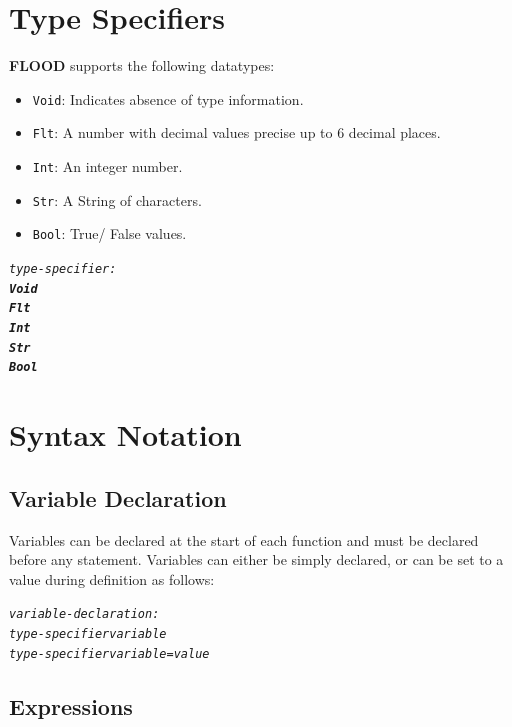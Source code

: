 \documentclass[12pt]{report}
\begin{document}
\section{Type Specifiers}

\textbf{FLOOD} supports the following datatypes:
\begin{itemize}
\item \texttt{Void}: Indicates absence of type information.
\item \texttt{Flt}: A number with decimal values precise up to 6 decimal places.
\item \texttt{Int}: An integer number.
\item \texttt{Str}: A String of characters.
\item \texttt{Bool}: True/ False values.
\end{itemize}
\begin{alltt}\begin{singlespace}
         \textit{type-specifier:}
              \textit{\textbf{Void}}
              \textit{\textbf{Flt}}
              \textit{\textbf{Int}}
              \textit{\textbf{Str}}
              \textit{\textbf{Bool}}\end{singlespace}
\end{alltt}

\section{Syntax Notation}

\subsection{Variable Declaration}

Variables can be declared at the start of each function and must be declared before any statement. Variables can either be simply declared, or can be set to a value during definition as follows:

\begin{alltt}\begin{singlespace}
         \textit{variable-declaration:}
              \textit{type-specifier variable}
              \textit{type-specifier variable = value}\end{singlespace}
\end{alltt}

\subsection{Expressions}
\end{document}
